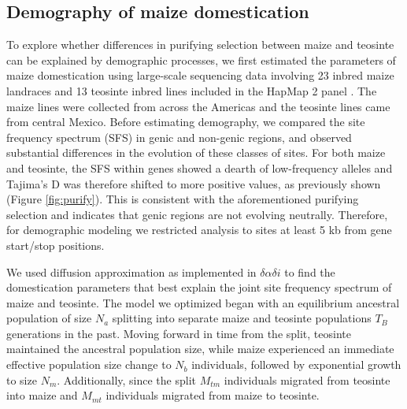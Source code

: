 \documentclass{pnastwo}
\begin{document}
\begin{article}
\subsection{Demography of maize domestication}
To explore whether differences in purifying selection between maize
and teosinte can be explained by demographic processes, we
first estimated the parameters of maize domestication using large-scale
sequencing data involving 23 inbred maize
landraces and 13 teosinte inbred lines included in the HapMap 2 panel
\cite{chia2012}. The maize
lines were collected from across the Americas and the teosinte lines
came from central Mexico. Before estimating demography, we compared
the site frequency spectrum (SFS) in genic and non-genic regions, and
observed substantial differences in the evolution of these classes of
sites. For both maize and teosinte, the SFS within genes showed a
dearth of low-frequency alleles and Tajima's D
\cite{tajima1989} was therefore shifted
to more positive values, as previously shown (Figure \ref{fig:purify}). This is consistent with the aforementioned purifying
selection and indicates that genic regions are not evolving
neutrally. Therefore, for demographic modeling we restricted analysis
to sites at least 5 kb from gene start/stop positions.




We used diffusion approximation as implemented in
$\delta\alpha\delta{i}$ \cite{gutenkunst2009} to find the domestication parameters that best explain
the joint site frequency spectrum of maize and teosinte.  The model we optimized began with an
equilibrium ancestral population of size $N_a$
splitting into separate maize and teosinte populations $T_B$ generations in the past. Moving forward in
time from the split, teosinte maintained the ancestral population size, while
maize experienced an immediate effective population size change to
$N_b$ individuals, followed by exponential growth to size
$N_m$. Additionally, since the split $M_{tm}$ individuals migrated
from teosinte into maize and $M_{mt}$ individuals migrated from maize
to teosinte.


\end{article}
\end{document}
